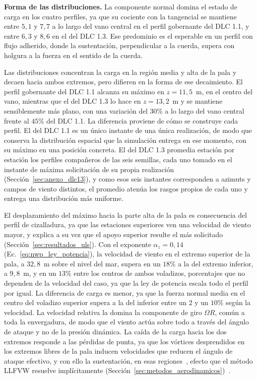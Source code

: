 \medskip
\noindent\textbf{Forma de las distribuciones.}
La componente normal domina el estado de carga en los cuatro perfiles, ya que su cociente con la tangencial se mantiene entre $5{,}1$ y $7{,}7$ a lo largo del vano central en el perfil gobernante del DLC 1.1, y entre $6{,}3$ y $8{,}6$ en el del DLC 1.3. Ese predominio es el esperable en un perfil con flujo adherido, donde la sustentación, perpendicular a la cuerda, supera con holgura a la fuerza en el sentido de la cuerda.

Las distribuciones concentran la carga en la región media y alta de la pala y decaen hacia ambos extremos, pero difieren en la forma de ese decaimiento. El perfil gobernante del DLC 1.1 alcanza su máximo en $z = 11{,}5$~m, en el centro del vano, mientras que el del DLC 1.3 lo hace en $z = 13{,}2$~m y se mantiene sensiblemente más plano, con una variación del $30\%$ a lo largo del vano central frente al $45\%$ del DLC 1.1. La diferencia proviene de cómo se construye cada perfil. El del DLC 1.1 es un único instante de una única realización, de modo que conserva la distribución espacial que la simulación entrega en ese momento, con su máximo en una posición concreta. El del DLC 1.3 promedia estación por estación los perfiles compañeros de las seis semillas, cada uno tomado en el instante de máxima solicitación de su propia realización (Sección~\ref{sec:anexo_dlc13}), y como esos seis instantes corresponden a azimuts y campos de viento distintos, el promedio atenúa los rasgos propios de cada uno y entrega una distribución más uniforme.

El desplazamiento del máximo hacia la parte alta de la pala es consecuencia del perfil de cizalladura, ya que las estaciones superiores ven una velocidad de viento mayor, y explica a su vez que el apoyo superior resulte el más solicitado (Sección~\ref{sec:resultados_uls}). Con el exponente $\alpha_z = 0{,}14$ (Ec.~\ref{eq:nwp_ley_potencia}), la velocidad de viento en el extremo superior de la pala, a $32{,}8$~m sobre el nivel del mar, supera en un $18\%$ a la del extremo inferior, a $9{,}8$~m, y en un $13\%$ entre los centros de ambos voladizos, porcentajes que no dependen de la velocidad del caso, ya que la ley de potencia escala todo el perfil por igual. La diferencia de carga es menor, ya que la fuerza normal media en el centro del voladizo superior supera a la del inferior entre un $2$ y un $10\%$ según la velocidad. La velocidad relativa la domina la componente de giro $\Omega R$, común a toda la envergadura, de modo que el viento actúa sobre todo a través del ángulo de ataque y no de la presión dinámica. La caída de la carga hacia los dos extremos responde a las pérdidas de punta, ya que los vórtices desprendidos en los extremos libres de la pala inducen velocidades que reducen el ángulo de ataque efectivo, y con ello la sustentación, en esas regiones~\parencite{Anderson2016}, efecto que el método LLFVW resuelve implícitamente (Sección~\ref{sec:metodos_aerodinamicos})~\parencite{marten2019qblade}.

